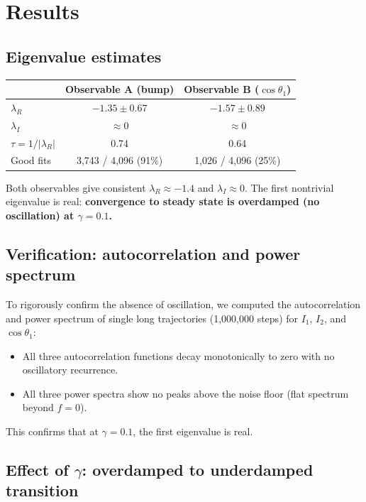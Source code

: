 \documentclass[11pt]{article}
\begin{document}
\section{Results}

\subsection{Eigenvalue estimates}

\begin{center}
\begin{tabular}{lcc}
\toprule
 & Observable A (bump) & Observable B ($\cos\theta_1$) \\
\midrule
$\lambda_R$ & $-1.35 \pm 0.67$ & $-1.57 \pm 0.89$ \\
$\lambda_I$ & $\approx 0$ & $\approx 0$ \\
$\tau = 1/|\lambda_R|$ & 0.74 & 0.64 \\
Good fits & 3,743 / 4,096 (91\%) & 1,026 / 4,096 (25\%) \\
\bottomrule
\end{tabular}
\end{center}

Both observables give consistent $\lambda_R \approx -1.4$ and $\lambda_I \approx 0$. The first nontrivial eigenvalue is real: \textbf{convergence to steady state is overdamped (no oscillation) at $\gamma = 0.1$.}

\subsection{Verification: autocorrelation and power spectrum}

To rigorously confirm the absence of oscillation, we computed the autocorrelation and power spectrum of single long trajectories (1,000,000 steps) for $I_1$, $I_2$, and $\cos\theta_1$:

\begin{itemize}
\item All three autocorrelation functions decay monotonically to zero with no oscillatory recurrence.
\item All three power spectra show no peaks above the noise floor (flat spectrum beyond $f=0$).
\end{itemize}

This confirms that at $\gamma = 0.1$, the first eigenvalue is real.

\subsection{Effect of $\gamma$: overdamped to underdamped transition}
\end{document}
